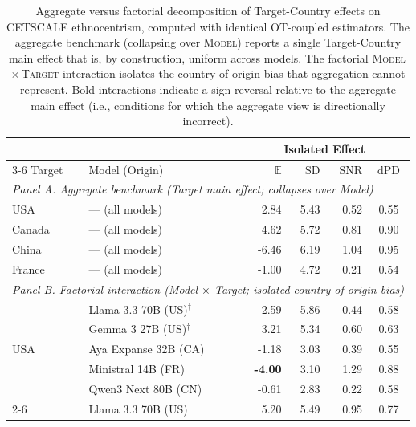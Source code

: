 \begin{table}[t]
  \centering
  \caption{Aggregate versus factorial decomposition of Target-Country effects
  on CETSCALE ethnocentrism, computed with identical OT-coupled estimators.
  The aggregate benchmark (collapsing over \textsc{Model}) reports a single
  Target-Country main effect that is, by construction, uniform across models.
  The factorial \textsc{Model}\,$\times$\,\textsc{Target} interaction isolates
  the country-of-origin bias that aggregation cannot represent. Bold interactions
  indicate a sign reversal relative to the aggregate main effect (i.e.,
  conditions for which the aggregate view is directionally incorrect).}
  \label{tab:aggregate-vs-factorial}
  \begin{small}
  \begin{sc}
  \begin{tabular}{llrrrc}
  \toprule
  & & \multicolumn{4}{c}{Isolated Effect} \\
  \cmidrule(lr){3-6}
  Target & Model (Origin) & $\mathbb{E}$ & SD & SNR & dPD \\
  \midrule
  \multicolumn{6}{l}{\textit{Panel A. Aggregate benchmark (Target main effect; collapses over Model)}} \\
  USA    & --- (all models) &  2.84 & 5.43 & 0.52 & 0.55 \\
  Canada & --- (all models) &  4.62 & 5.72 & 0.81 & 0.90 \\
  China  & --- (all models) & -6.46 & 6.19 & 1.04 & 0.95 \\
  France & --- (all models) & -1.00 & 4.72 & 0.21 & 0.54 \\
  \midrule
  \multicolumn{6}{l}{\textit{Panel B. Factorial interaction (Model $\times$ Target; isolated country-of-origin bias)}} \\
  \multirow{5}{*}{USA}
    & Llama 3.3 70B (US)$^{\dagger}$ &  2.59 & 5.86 & 0.44 & 0.58 \\
    & Gemma 3 27B (US)$^{\dagger}$   &  3.21 & 5.34 & 0.60 & 0.63 \\
    & Aya Expanse 32B (CA)           & -1.18 & 3.03 & 0.39 & 0.55 \\
    & Ministral 14B (FR)             & \textbf{-4.00} & 3.10 & 1.29 & 0.88 \\
    & Qwen3 Next 80B (CN)            & -0.61 & 2.83 & 0.22 & 0.58 \\
  \cmidrule(lr){2-6}
  \multirow{5}{*}{Canada}
    & Llama 3.3 70B (US)             &  5.20 & 5.49 & 0.95 & 0.77 \\

\end{tabular}
\end{sc}
\end{small}
\end{table}

